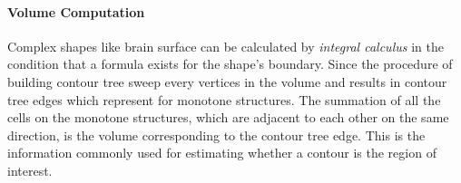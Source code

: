 \documentclass[11pt, b5paper]{report}
\begin{document}
\paragraph{Volume Computation}
Complex shapes like brain surface can be calculated by 
\emph{integral calculus} in the condition that a formula exists for the 
shape's boundary. Since the procedure of building contour tree sweep
every vertices in the volume and results in contour tree edges which 
represent for monotone structures. The summation of all the cells on 
the monotone structures, which are adjacent to each other on the same 
direction, is the volume corresponding to the contour tree edge. 
This is the information commonly used for estimating whether a contour is 
the region of interest.

% 




\end{document}

